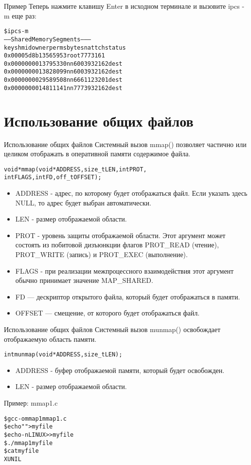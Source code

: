 \documentclass{beamer}
\begin{document}
\begin{frame}[fragile]{Пример}
Теперь нажмите клавишу Enter в исходном терминале и вызовите ipcs -m еще раз:
\begin{alltt}
\$ ipcs -m
------ Shared Memory Segments --------
key shmid owner perms bytes nattch status
0x00005d8b 13565953 root 777 316 1
0x00000000 13795330 nn 600 393216 2 dest
0x00000000 13828099 nn 600 393216 2 dest
0x00000000 29589508 nn 666 112320 1 dest
0x00000000 14811141 nn 777 393216 2 dest
\end{alltt}
\end{frame}

\section{Использование общих файлов}

\begin{frame}[fragile]{Использование общих файлов}
Системный вызов mmap() позволяет частично или целиком отображать в оперативной памяти содержимое файла.
\begin{alltt}
void * mmap (void * ADDRESS, size_t LEN, int PROT,
   int FLAGS, int FD, off_t OFFSET);
\end{alltt}
\begin{itemize}
\item ADDRESS - адрес, по которому будет отображаться файл. Если указать здесь NULL, то адрес будет выбран автоматически.
\item LEN - размер отображаемой области.
\item PROT - уровень защиты отображаемой области. Этот аргумент может состоять из побитовой дизъюнкции флагов 
PROT\_READ (чтение), PROT\_WRITE (запись) и PROT\_EXEC (выполнение).
\item FLAGS - при реализации межпроцессного взаимодействия этот аргумент обычно принимает значение MAP\_SHARED.
\item FD — дескриптор открытого файла, который будет отображаться в памяти.
\item OFFSET — смещение, от которого будет отображаться файл.
\end{itemize}
\end{frame}

\begin{frame}[fragile]{Использование общих файлов}
Системный вызов munmap() освобождает отображаемую область памяти.
\begin{alltt}
int munmap (void * ADDRESS, size_t LEN);
\end{alltt}
\begin{itemize}
\item ADDRESS - буфер отображаемой памяти, который будет освобожден.
\item LEN - размер отображаемой области.
\end{itemize}
Пример: mmap1.c
\begin{alltt}
\$ gcc -o mmap1 mmap1.c
\$ echo "" > myfile
\$ echo -n LINUX >> myfile
\$ ./mmap1 myfile
\$ cat myfile
XUNIL
\end{alltt}
\end{frame}
\end{document}
